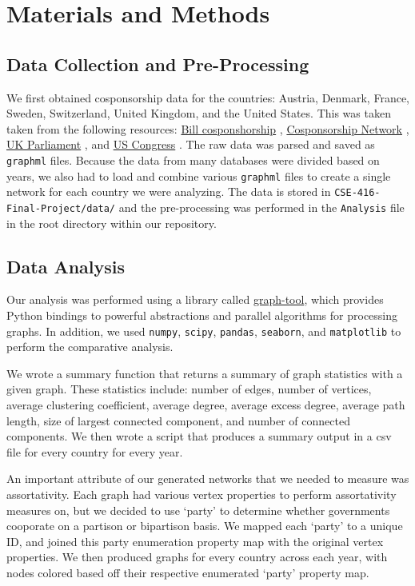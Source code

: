 \documentclass[12pt]{article}
\begin{document}
\section{Materials and Methods}

\subsection{Data Collection and Pre-Processing}
We first obtained cosponsorship data for the countries: Austria, Denmark, France, Sweden, Switzerland, United Kingdom, and the United States. This was taken taken from the following resources: \underline{Bill cosponshorship} \cite{briatte}, \underline{Cosponsorship Network} \cite{fowler}, \underline{UK Parliament} \cite{UK}, and \underline{US Congress} \cite{US}. The raw data was parsed and saved as \texttt{graphml} files. Because the data from many databases were divided based on years, we also had to load and combine various \texttt{graphml} files to create a single network for each country we were analyzing. The data is stored in \texttt{CSE-416-Final-Project/data/} and the pre-processing was performed in the \texttt{Analysis} file in the root directory within our repository.


\subsection{Data Analysis}

Our analysis was performed using a library called \href{https://graph-tool.skewed.de}{graph-tool}, which provides Python bindings to powerful abstractions and parallel algorithms for processing graphs. In addition, we used \texttt{numpy}, \texttt{scipy}, \texttt{pandas}, \texttt{seaborn}, and \texttt{matplotlib} to perform the comparative analysis.

We wrote a summary function that returns a summary of graph statistics with a given graph. These statistics include: number of edges, number of vertices, average clustering coefficient, average degree, average excess degree, average path length, size of largest connected component, and number of connected components. We then wrote a script that produces a summary output in a csv file for every country for every year. 

An important attribute of our generated networks that we needed to measure was assortativity. Each graph had various vertex properties to perform assortativity measures on, but we decided to use `party' to determine whether governments cooporate on a partison or bipartison basis. We mapped each `party' to a unique ID, and joined this party enumeration property map with the original vertex properties. We then produced graphs for every country across each year, with nodes colored based off their respective enumerated `party' property map.
\end{document}
